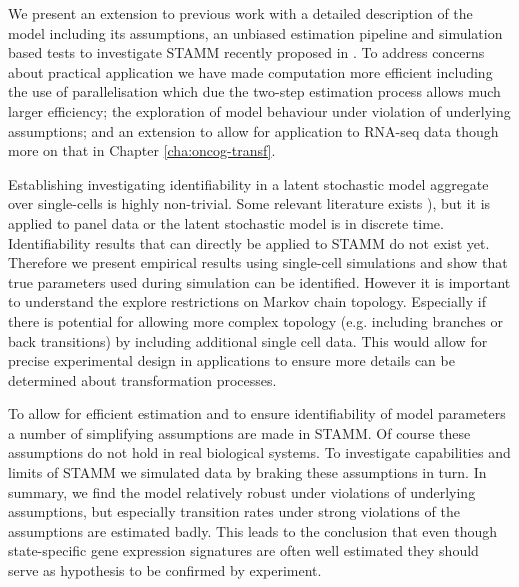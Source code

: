 We present an extension to previous work with a detailed description of the model including its assumptions, an unbiased estimation pipeline and simulation based tests to investigate STAMM recently proposed in \cite{Armond:2013}. To address concerns about practical application we have made computation more efficient including the use of parallelisation which due the two-step estimation process allows much larger efficiency; the exploration of model behaviour under violation of underlying assumptions; and an extension to allow for application to RNA-seq data though more on that in Chapter \ref{cha:oncog-transf}.



Establishing investigating identifiability in a latent stochastic model aggregate over single-cells is highly non-trivial. Some relevant literature exists \citep{Kalbfleisch:1983vd, Kalbfleisch:1984wz, Kalbfleisch:1985tw}), but it is applied to panel data or the latent stochastic model is in discrete time. Identifiability results that can directly be applied to STAMM do not exist yet.  Therefore we present empirical results using single-cell simulations and show that true parameters used during simulation can be identified. However it is important to understand the explore restrictions on Markov chain topology. Especially if there is potential for allowing more complex topology (e.g. including branches or back transitions) by including additional single cell data. This would allow for precise experimental design in applications to ensure more details can be determined about transformation processes.
  
To allow for efficient estimation and to ensure identifiability of model parameters a number of simplifying assumptions are made in STAMM. Of course these assumptions do not hold in real biological systems. To investigate capabilities and limits of STAMM we simulated data by braking these assumptions in turn. In summary, we find the model relatively robust under violations of underlying assumptions, but especially transition rates under strong violations of the assumptions are estimated badly. This leads to the conclusion that even though state-specific gene expression signatures are often well estimated they should serve as hypothesis to be confirmed by experiment.


